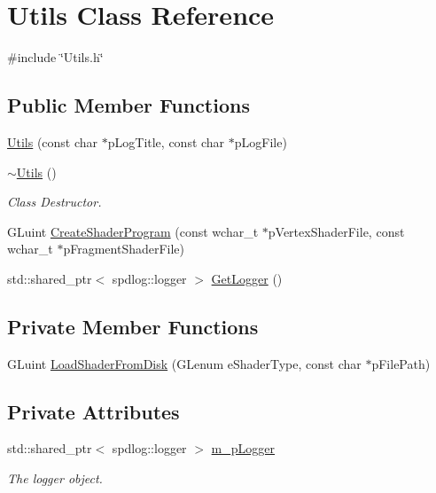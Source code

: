\hypertarget{class_utils}{}\section{Utils Class Reference}
\label{class_utils}


{\ttfamily \#include \char`\"{}Utils.\+h\char`\"{}}

\subsection*{Public Member Functions}
\begin{DoxyCompactItemize}
\item 
\mbox{\hyperlink{class_utils_a059a8e013417d7a5e3a0b6244e47c88c}{Utils}} (const char $\ast$p\+Log\+Title, const char $\ast$p\+Log\+File)
\item 
\mbox{\hyperlink{class_utils_afa5e70facffc286607498e7edb639b8a}{$\sim$\+Utils}} ()
\begin{DoxyCompactList}\small\item\em Class Destructor. \end{DoxyCompactList}\item 
G\+Luint \mbox{\hyperlink{class_utils_a564bcf419de232061809ebf62b4ce107}{Create\+Shader\+Program}} (const wchar\+\_\+t $\ast$p\+Vertex\+Shader\+File, const wchar\+\_\+t $\ast$p\+Fragment\+Shader\+File)
\item 
std\+::shared\+\_\+ptr$<$ spdlog\+::logger $>$ \mbox{\hyperlink{class_utils_a8a9dbd079fb703e15db6bab8c15c46d6}{Get\+Logger}} ()
\end{DoxyCompactItemize}
\subsection*{Private Member Functions}
\begin{DoxyCompactItemize}
\item 
G\+Luint \mbox{\hyperlink{class_utils_a74d078eb4722f5ac705b1ffb010e10d4}{Load\+Shader\+From\+Disk}} (G\+Lenum e\+Shader\+Type, const char $\ast$p\+File\+Path)
\end{DoxyCompactItemize}
\subsection*{Private Attributes}
\begin{DoxyCompactItemize}
\item 
std\+::shared\+\_\+ptr$<$ spdlog\+::logger $>$ \mbox{\hyperlink{class_utils_a2d2d607e23e16fdd88f2983c1d1b408d}{m\+\_\+p\+Logger}}
\begin{DoxyCompactList}\small\item\em The logger object. \end{DoxyCompactList}\end{DoxyCompactItemize}


